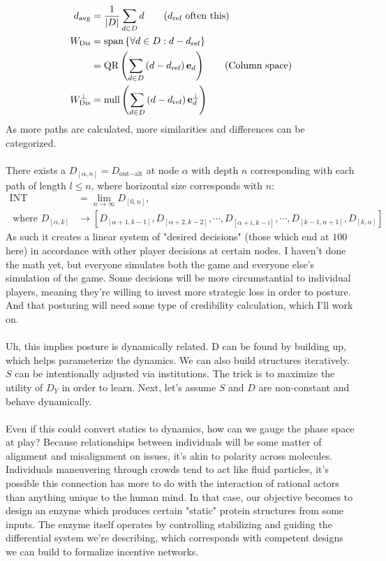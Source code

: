 \documentclass{article}
\begin{document}
\begin{align*}
    d_{\text{avg}}&=\frac{1}{\left|D\right|}\sum_{d\in D}d\tag{$d_{\text{ref}}$ often this}\\
    W_{\text{Dis}}&=\text{span}\left\{\forall d\in D: d-d_{\text{ref}}\right\}\\
    &=\text{QR}\left(\sum_{d\in D}\left(d-d_{\text{ref}}\right)\mathbf{e}_d\right)\tag{Column space}\\
    W_{\text{Dis}}^\perp&=\text{null}\left(\sum_{d\in D}\left(d-d_{\text{ref}}\right)\mathbf{e}_d^\perp\right)
\end{align*}
As more paths are calculated, more similarities and differences can be categorized.
\\
\\
There exists a $D_{[\alpha,n]}=D_{\text{out}-\text{alt}}$ at node $\alpha$ with depth $n$ corresponding with each path of length $l\leq n$, where horizontal size corresponds with $n$:
\begin{align*}
    \text{INT}&=\lim_{n\to\infty}D_{[0,n]},\tag{0 nodes are axioms}\\
    \text{ where }D_{[\alpha,k]}&\to\left[D_{[\alpha+1,k-1]},D_{[\alpha+2,k-2]},\cdots,D_{[\alpha+i,k-i]},\cdots,D_{[k-1,\alpha+1]},D_{[k,\alpha]}\right]
\end{align*}
As such it creates a linear system of "desired decisions" (those which end at $\boxed{100}$ here) in accordance with other player decisions at certain nodes. I haven't done the math yet, but everyone simulates both the game and everyone else's simulation of the game. Some decisions will be more circumstantial to individual players, meaning they're willing to invest more strategic loss in order to posture. And that posturing will need some type of credibility calculation, which I'll work on.
\\
\\
Uh, this implies posture is dynamically related. D can be found by building up, which helps parameterize the dynamics. We can also build structures iteratively. $S$ can be intentionally adjusted via institutions. The trick is to maximize the utility of $D_Y$ in order to learn. Next, let's assume $S$ and $D$ are non-constant and behave dynamically.
\\
\\
Even if this could convert statics to dynamics, how can we gauge the phase space at play? Because relationships between individuals will be some matter of alignment and misalignment on issues, it's akin to polarity across molecules. Individuals maneuvering through crowds tend to act like fluid particles, it's possible this connection has more to do with the interaction of rational actors than anything unique to the human mind. In that case, our objective becomes to design an enzyme which produces certain "static" protein structures from some inputs. The enzyme itself operates by controlling stabilizing and guiding the differential system we're describing, which corresponds with competent designs we can build to formalize incentive networks.
\end{document}
